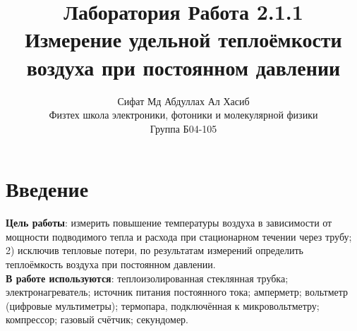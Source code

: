\documentclass[a4paper, 12pt]{article}%
\author{Сифат Мд Абдуллах Ал Хасиб \\
Физтех школа электроники, фотоники и молекулярной физики \\
Группа Б04-105}
\title{\textbf{Лаборатория Работа 2.1.1 \\ 
Измерение удельной теплоёмкости воздуха при постоянном давлении}}
\begin{document}
\maketitle 
\section{Введение}\textbf{Цель работы}: измерить повышение температуры воздуха в зависимости от мощности подводимого тепла и расхода при стационарном течении через трубу; 
2) исключив тепловые потери, по результатам измерений определить теплоёмкость воздуха при постоянном давлении.\\
\textbf{В работе используются}: теплоизолированная стеклянная трубка; электронагреватель; источник питания постоянного тока; амперметр; вольтметр (цифровые мультиметры); термопара, подключённая к микровольтметру; компрессор; газовый счётчик; секундомер.
\end{document}
